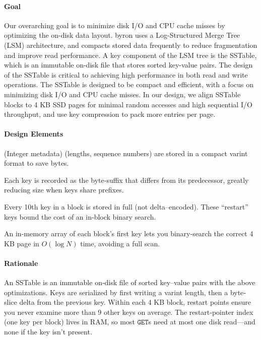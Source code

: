 \documentclass[10pt]{article}
\begin{document}
\paragraph{Goal}
Our overarching goal is to minimize disk I/O and CPU cache misses by optimizing the on-disk data layout.
byron uses a Log-Structured Merge Tree (LSM) architecture, and compacts stored data frequently to reduce fragmentation and improve read performance.
A key component of the LSM tree is the SSTable, which is an immutable on-disk file that stores sorted key-value pairs. The design of the SSTable is critical to achieving high performance in both read and write operations.
The SSTable is designed to be compact and efficient, with a focus on minimizing disk I/O and CPU cache misses. 
In our design, we align SSTable blocks to 4 KB SSD pages for minimal random accesses and high sequential I/O throughput, and use key compression to pack more entries per page.

\paragraph{Design Elements}

\begin{description}[leftmargin=1em,labelwidth=*,itemsep=0.5ex]
  \item[Varint Encoding] (Integer metadata) (lengths, sequence numbers) are stored in a compact varint format to save bytes.
  \item[Delta Encoding (Prefix Compression)] Each key is recorded as the byte‐suffix that differs from its predecessor, greatly reducing size when keys share prefixes.
  \item[Restart Points] Every 10th key in a block is stored in full (not delta–encoded).  These “restart” keys bound the cost of an in‐block binary search.
  \item[Page Hash Index] An in‐memory array of each block’s first key lets you binary‐search the correct 4 KB page in $O(\log N)$ time, avoiding a full scan.
\end{description}

\paragraph{Rationale}
An SSTable is an immutable on‐disk file of sorted key–value pairs with the above optimizations.  
Keys are serialized by first writing a varint length, then a byte‐slice delta from the previous key.  
Within each 4 KB block, restart points ensure you never examine more than 9 other keys on average.  
The restart‐pointer index (one key per block) lives in RAM, so most $\mathtt{GET}$s need at most one disk read—and none if the key isn’t present.  
\end{document}
